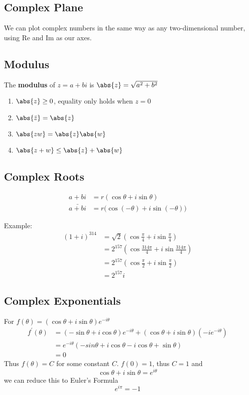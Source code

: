 \documentclass[12pt]{article}
\begin{document}
\subsection*{Complex Plane}
We can plot complex numbers in the same way as any two-dimensional number, using Re and Im as our axes.

\subsection*{Modulus}
The {\bf modulus} of $z = a + bi$ is $\abs{z} = \sqrt{a^2+b^2}$

\begin{enumerate}
\item $\abs{z} \geq 0$, equality only holds when $ z = 0$
\item $\abs{\bar{z}} = \abs{z}$
\item $\abs{zw} = \abs{z}\abs{w}$
\item $\abs{z + w} \leq \abs{z} + \abs{w}$
\end{enumerate}

\subsection*{Complex Roots}
\begin{align*}
a + bi &= r(\cos\theta + i\sin\theta)\\
\bar{a+bi} &= r\bigl(\cos(-\theta) + i\sin(-\theta)\bigl)
\end{align*}

Example:
\begin{align*}
(1 + i)^{314} &= \sqrt{2}(\cos\frac{\pi}{4} + i\sin\frac{\pi}{4})\\
&= 2^{157}(\cos\frac{314\pi}{4} + i\sin\frac{314\pi}{4})\\
&= 2^{157}(\cos\frac{\pi}{2} + i\sin\frac{\pi}{2})\\
&= 2^{157}i
\end{align*}

\subsection*{Complex Exponentials}
For $f(\theta) = (\cos\theta + i\sin\theta)e^{-i\theta}$
\begin{align*}
f^\prime(\theta) &= (-\sin\theta + i\cos\theta)e^{-i\theta} + (\cos\theta + i\sin\theta)(-ie^{-i\theta})\\
&= e^{-i\theta}(-sin\theta + i\cos\theta - i\cos\theta + \sin\theta)\\
&= 0
\end{align*}
Thus $f(\theta) = C$ for some constant $C$. $f(0) = 1$, thus $C = 1$ and \[ \cos\theta + i\sin\theta = e^{i\theta} \] we can reduce this to Euler's Formula \[ e^{i\pi} = -1 \]
\end{document}
